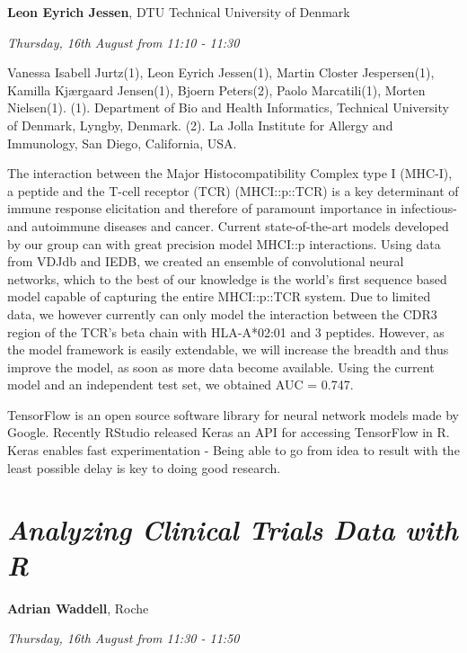 \documentclass[]{book}
\theoremstyle{definition}
\theoremstyle{definition}
\theoremstyle{definition}
\theoremstyle{remark}
\begin{document}
\textbf{Leon Eyrich Jessen}, DTU Technical University of Denmark

\emph{Thursday, 16th August from 11:10 - 11:30}

Vanessa Isabell Jurtz(1), Leon Eyrich Jessen(1), Martin Closter
Jespersen(1), Kamilla Kjærgaard Jensen(1), Bjoern Peters(2), Paolo
Marcatili(1), Morten Nielsen(1). (1). Department of Bio and Health
Informatics, Technical University of Denmark, Lyngby, Denmark. (2). La
Jolla Institute for Allergy and Immunology, San Diego, California, USA.

The interaction between the Major Histocompatibility Complex type I
(MHC-I), a peptide and the T-cell receptor (TCR) (MHCI::p::TCR) is a key
determinant of immune response elicitation and therefore of paramount
importance in infectious- and autoimmune diseases and cancer. Current
state-of-the-art models developed by our group can with great precision
model MHCI::p interactions. Using data from VDJdb and IEDB, we created
an ensemble of convolutional neural networks, which to the best of our
knowledge is the world's first sequence based model capable of capturing
the entire MHCI::p::TCR system. Due to limited data, we however
currently can only model the interaction between the CDR3 region of the
TCR's beta chain with HLA-A*02:01 and 3 peptides. However, as the model
framework is easily extendable, we will increase the breadth and thus
improve the model, as soon as more data become available. Using the
current model and an independent test set, we obtained AUC = 0.747.

TensorFlow is an open source software library for neural network models
made by Google. Recently RStudio released Keras an API for accessing
TensorFlow in R. Keras enables fast experimentation - Being able to go
from idea to result with the least possible delay is key to doing good
research.

\hypertarget{analyzing-clinical-trials-data-with-r-1}{%
\section{\texorpdfstring{\emph{Analyzing Clinical Trials Data with
R}}{Analyzing Clinical Trials Data with R}}\label{analyzing-clinical-trials-data-with-r-1}}

\textbf{Adrian Waddell}, Roche

\emph{Thursday, 16th August from 11:30 - 11:50}
\end{document}
